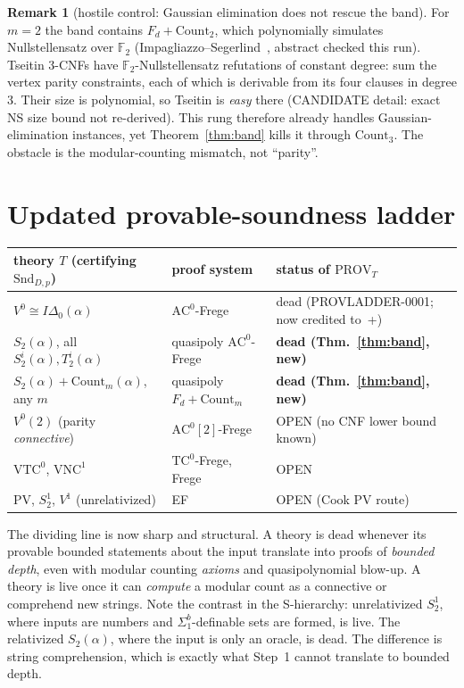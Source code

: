 \documentclass[11pt]{article}
\theoremstyle{definition}
\newtheorem{remark}[theorem]{Remark}
\newcommand{\Snd}{\mathrm{Snd}}
\newcommand{\Count}{\mathrm{Count}}
\begin{document}
\begin{remark}[hostile control: Gaussian elimination does not rescue the band]\label{rem:tseitin}
For $m=2$ the band contains $F_d+\Count_2$, which polynomially simulates Nullstellensatz over $\mathbb F_2$
(Impagliazzo--Segerlind~\cite{IS06}, abstract checked this run). Tseitin 3-CNFs have $\mathbb F_2$-Nullstellensatz refutations of
constant degree: sum the vertex parity constraints, each of which is derivable from its four clauses in degree 3. Their size is
polynomial, so Tseitin is \emph{easy} there (CANDIDATE detail: exact NS size bound not re-derived). This rung therefore already handles
Gaussian-elimination instances, yet Theorem~\ref{thm:band} kills it through $\Count_3$. The obstacle is the modular-counting
mismatch, not ``parity''.
\end{remark}

\section{Updated provable-soundness ladder}
\begin{center}
\begin{tabular}{@{}lll@{}}
\toprule
theory $T$ (certifying $\Snd_{D,p}$) & proof system & status of $\mathrm{PROV}_T$\\
\midrule
$V^0\cong I\Delta_0(\alpha)$ & $\mathrm{AC}^0$-Frege & dead (PROVLADDER-0001; now credited to~\cite{KP89}+\cite{BS02})\\
$S_2(\alpha)$, all $S^i_2(\alpha),T^i_2(\alpha)$ & quasipoly $\mathrm{AC}^0$-Frege & \textbf{dead (Thm.~\ref{thm:band}, new)}\\
$S_2(\alpha)+\Count_m(\alpha)$, any $m$ & quasipoly $F_d+\Count_m$ & \textbf{dead (Thm.~\ref{thm:band}, new)}\\
$V^0(2)$ (parity \emph{connective}) & $\mathrm{AC}^0[2]$-Frege & OPEN (no CNF lower bound known)\\
$\mathrm{VTC}^0$, $\mathrm{VNC}^1$ & $\mathrm{TC}^0$-Frege, Frege & OPEN\\
PV, $S^1_2$, $V^1$ (unrelativized) & EF & OPEN (Cook PV route)\\
\bottomrule
\end{tabular}
\end{center}
The dividing line is now sharp and structural. A theory is dead whenever its provable bounded statements about the input translate into
proofs of \emph{bounded depth}, even with modular counting \emph{axioms} and quasipolynomial blow-up. A theory is live once it can
\emph{compute} a modular count as a connective or comprehend new strings. Note the contrast in the S-hierarchy: unrelativized $S^1_2$,
where inputs are numbers and $\Sigma^b_1$-definable sets are formed, is live. The relativized $S_2(\alpha)$, where the input is only an oracle, is dead.
The difference is string comprehension, which is exactly what Step~1 cannot translate to bounded depth.
\end{document}

